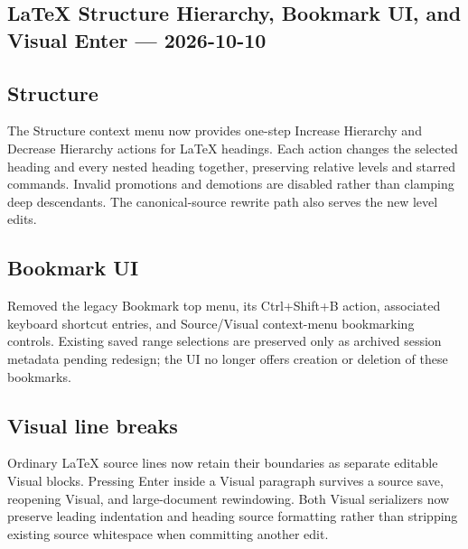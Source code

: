 \documentclass[a4paper]{article}
\title{}
\date{}
\author{Mohammad Rahmani}
\begin{document}
   \maketitle

   \begin{preview}
\section*{LaTeX Structure Hierarchy, Bookmark UI, and Visual Enter --- 2026-10-10}
\subsection*{Structure}
The Structure context menu now provides one-step Increase Hierarchy and Decrease
Hierarchy actions for LaTeX headings. Each action changes the selected heading
and every nested heading together, preserving relative levels and starred commands.
Invalid promotions and demotions are disabled rather than clamping deep descendants.
The canonical-source rewrite path also serves the new level edits.

\subsection*{Bookmark UI}
Removed the legacy Bookmark top menu, its Ctrl+Shift+B action, associated keyboard
shortcut entries, and Source/Visual context-menu bookmarking controls. Existing
saved range selections are preserved only as archived session metadata pending
redesign; the UI no longer offers creation or deletion of these bookmarks.

\subsection*{Visual line breaks}
Ordinary LaTeX source lines now retain their boundaries as separate editable
Visual blocks. Pressing Enter inside a Visual paragraph survives a source save,
reopening Visual, and large-document rewindowing. Both Visual serializers now
preserve leading indentation and heading source formatting rather than stripping
existing source whitespace when committing another edit.

   \end{preview}

   
   
\end{document}
